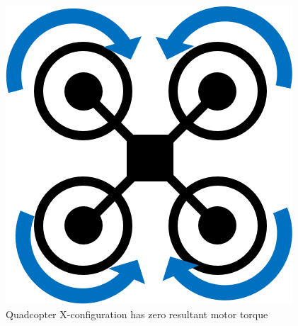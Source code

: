 \begin{figure}[H]
    \centering
    \includegraphics[scale=0.4]{img/drone_xconfigt}
    \caption{Quadcopter X-configuration has zero resultant motor torque}
    \label{fig:quadcopter-x-t}
\end{figure}

